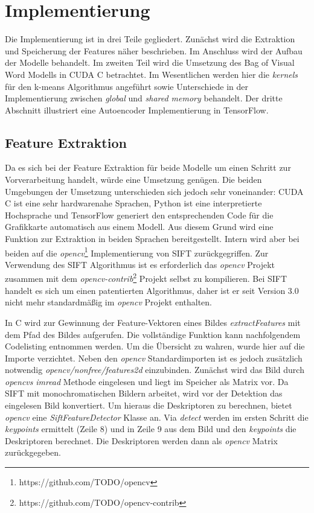 \chapter{Implementierung}

Die Implementierung ist in drei Teile gegliedert. Zunächst wird die Extraktion und Speicherung der Features näher beschrieben. Im Anschluss wird der Aufbau der Modelle behandelt. Im zweiten Teil wird die Umsetzung des Bag of Visual Word Modells in CUDA C betrachtet. Im Wesentlichen werden hier die \textit{kernels} für den k-means Algorithmus angeführt sowie Unterschiede in der Implementierung zwischen \textit{global} und \textit{shared memory} behandelt. Der dritte Abschnitt illustriert eine Autoencoder Implementierung in TensorFlow. 

\section{Feature Extraktion}

Da es sich bei der Feature Extraktion für beide Modelle um einen Schritt zur Vorverarbeitung handelt, würde eine Umsetzung genügen. Die beiden Umgebungen der Umsetzung unterschieden sich jedoch sehr voneinander: CUDA C ist eine sehr hardwarenahe Sprachen, Python ist eine interpretierte Hochsprache und TensorFlow generiert den entsprechenden Code für die Grafikkarte automatisch aus einem Modell. Aus diesem Grund wird eine Funktion zur Extraktion in beiden Sprachen bereitgestellt. Intern wird aber bei beiden auf die \textit{opencv}\footnote{https://github.com/TODO/opencv} Implementierung von SIFT zurückgegriffen. Zur Verwendung des SIFT Algorithmus ist es erforderlich das \textit{opencv} Projekt zusammen mit dem \textit{opencv-contrib}\footnote{https://github.com/TODO/opencv-contrib} Projekt selbst zu kompilieren. Bei SIFT handelt es sich um einen patentierten Algorithmus, daher ist er seit Version 3.0 nicht mehr standardmäßig im \textit{opencv} Projekt enthalten. 

In C wird zur Gewinnung der Feature-Vektoren eines Bildes \textit{extractFeatures} mit dem Pfad des Bildes aufgerufen. Die vollständige Funktion kann nachfolgendem Codelisting entnommen werden. Um die Übersicht zu wahren, wurde hier auf die Importe verzichtet. Neben den \textit{opencv} Standardimporten ist es jedoch zusätzlich notwendig \textit{opencv/nonfree/features2d} einzubinden. Zunächst wird das Bild durch \textit{opencvs} \textit{imread} Methode eingelesen und liegt im Speicher als Matrix vor. Da SIFT mit monochromatischen Bildern arbeitet, wird vor der Detektion das eingelesen Bild konvertiert. Um hieraus die Deskriptoren zu berechnen, bietet \textit{opencv} eine \textit{SiftFeatureDetector} Klasse an. Via \textit{detect} werden im ersten Schritt die \textit{keypoints} ermittelt (Zeile 8) und in Zeile 9 aus dem Bild und den \textit{keypoints} die Deskriptoren berechnet. Die Deskriptoren werden dann als \textit{opencv} Matrix zurückgegeben.

